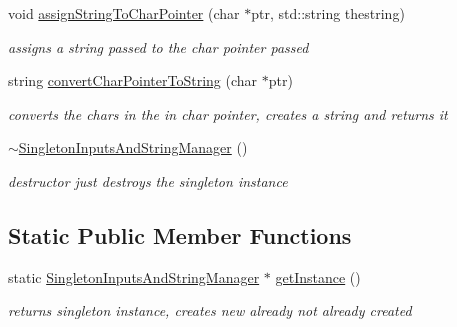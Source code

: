 \begin{DoxyCompactItemize}
\hypertarget{class_singleton_inputs_and_string_manager_a89c5aee7afb7dc00c8d6f5347d401dd4}{}\label{class_singleton_inputs_and_string_manager_a89c5aee7afb7dc00c8d6f5347d401dd4} 
void \hyperlink{class_singleton_inputs_and_string_manager_a89c5aee7afb7dc00c8d6f5347d401dd4}{assign\+String\+To\+Char\+Pointer} (char $\ast$ptr, std\+::string thestring)
\begin{DoxyCompactList}\small\item\em assigns a string passed to the char pointer passed \end{DoxyCompactList}\item 
\hypertarget{class_singleton_inputs_and_string_manager_aee142d4de840261517ffa0e9ef07ee91}{}\label{class_singleton_inputs_and_string_manager_aee142d4de840261517ffa0e9ef07ee91} 
string \hyperlink{class_singleton_inputs_and_string_manager_aee142d4de840261517ffa0e9ef07ee91}{convert\+Char\+Pointer\+To\+String} (char $\ast$ptr)
\begin{DoxyCompactList}\small\item\em converts the chars in the in char pointer, creates a string and returns it \end{DoxyCompactList}\item 
\hypertarget{class_singleton_inputs_and_string_manager_acb31dc8e0340913eb2287a3fde20344f}{}\label{class_singleton_inputs_and_string_manager_acb31dc8e0340913eb2287a3fde20344f} 
\hyperlink{class_singleton_inputs_and_string_manager_acb31dc8e0340913eb2287a3fde20344f}{$\sim$\+Singleton\+Inputs\+And\+String\+Manager} ()
\begin{DoxyCompactList}\small\item\em destructor just destroys the singleton instance \end{DoxyCompactList}\end{DoxyCompactItemize}
\subsection*{Static Public Member Functions}
\begin{DoxyCompactItemize}
\item 
\hypertarget{class_singleton_inputs_and_string_manager_a8c802a3e22965effe1131370dc044f5a}{}\label{class_singleton_inputs_and_string_manager_a8c802a3e22965effe1131370dc044f5a} 
static \hyperlink{class_singleton_inputs_and_string_manager}{Singleton\+Inputs\+And\+String\+Manager} $\ast$ \hyperlink{class_singleton_inputs_and_string_manager_a8c802a3e22965effe1131370dc044f5a}{get\+Instance} ()
\begin{DoxyCompactList}\small\item\em returns singleton instance, creates new already not already created \end{DoxyCompactList}\end{DoxyCompactItemize}


